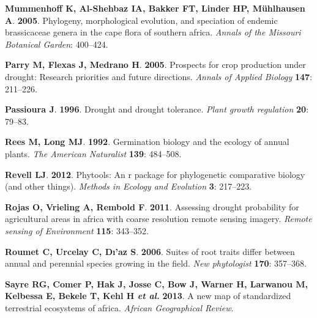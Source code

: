 \documentclass[man,floatsintext]{apa6}
\theoremstyle{definition}
\theoremstyle{definition}
\theoremstyle{definition}
\theoremstyle{remark}
\begin{document}
\leavevmode\hypertarget{ref-mummenhoff2005phylogeny}{}%
\textbf{\textnormal{Mummenhoff K}, \textnormal{Al-Shehbaz IA},
\textnormal{Bakker FT}, \textnormal{Linder HP}, \textnormal{Mühlhausen
A}}. \textbf{2005}. Phylogeny, morphological evolution, and speciation
of endemic brassicaceae genera in the cape flora of southern africa.
\emph{Annals of the Missouri Botanical Garden}: 400--424.

\leavevmode\hypertarget{ref-parry2005prospects}{}%
\textbf{\textnormal{Parry M}, \textnormal{Flexas J}, \textnormal{Medrano
H}}. \textbf{2005}. Prospects for crop production under drought:
Research priorities and future directions. \emph{Annals of Applied
Biology} \textbf{147}: 211--226.

\leavevmode\hypertarget{ref-passioura1996drought}{}%
\textbf{\textnormal{Passioura J}}. \textbf{1996}. Drought and drought
tolerance. \emph{Plant growth regulation} \textbf{20}: 79--83.

\leavevmode\hypertarget{ref-rees1992germination}{}%
\textbf{\textnormal{Rees M}, \textnormal{Long MJ}}. \textbf{1992}.
Germination biology and the ecology of annual plants. \emph{The American
Naturalist} \textbf{139}: 484--508.

\leavevmode\hypertarget{ref-revell2012phytools}{}%
\textbf{\textnormal{Revell LJ}}. \textbf{2012}. Phytools: An r package
for phylogenetic comparative biology (and other things). \emph{Methods
in Ecology and Evolution} \textbf{3}: 217--223.

\leavevmode\hypertarget{ref-rojas2011assessing}{}%
\textbf{\textnormal{Rojas O}, \textnormal{Vrieling A},
\textnormal{Rembold F}}. \textbf{2011}. Assessing drought probability
for agricultural areas in africa with coarse resolution remote sensing
imagery. \emph{Remote sensing of Environment} \textbf{115}: 343--352.

\leavevmode\hypertarget{ref-roumet2006suites}{}%
\textbf{\textnormal{Roumet C}, \textnormal{Urcelay C}, \textnormal{Dı'az
S}}. \textbf{2006}. Suites of root traits differ between annual and
perennial species growing in the field. \emph{New phytologist}
\textbf{170}: 357--368.

\leavevmode\hypertarget{ref-sayre2013new}{}%
\textbf{\textnormal{Sayre RG}, \textnormal{Comer P}, \textnormal{Hak J},
\textnormal{Josse C}, \textnormal{Bow J}, \textnormal{Warner H},
\textnormal{Larwanou M}, \textnormal{Kelbessa E}, \textnormal{Bekele T},
\textnormal{Kehl H} \emph{et al.}} \textbf{2013}. A new map of
standardized terrestrial ecosystems of africa. \emph{African
Geographical Review}.
\end{document}

